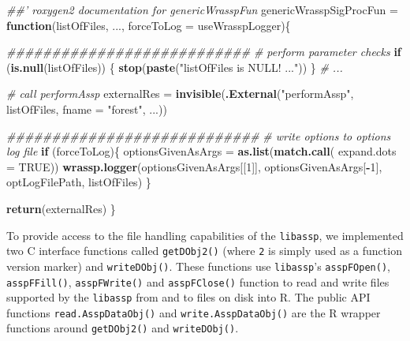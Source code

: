 \documentclass[]{book}
\newenvironment{Shaded}{\begin{snugshade}}{\end{snugshade}}
\newcommand{\CommentTok}[1]{\textcolor[rgb]{0.56,0.35,0.01}{\textit{#1}}}
\newcommand{\ControlFlowTok}[1]{\textcolor[rgb]{0.13,0.29,0.53}{\textbf{#1}}}
\newcommand{\DataTypeTok}[1]{\textcolor[rgb]{0.13,0.29,0.53}{#1}}
\newcommand{\DecValTok}[1]{\textcolor[rgb]{0.00,0.00,0.81}{#1}}
\newcommand{\KeywordTok}[1]{\textcolor[rgb]{0.13,0.29,0.53}{\textbf{#1}}}
\newcommand{\NormalTok}[1]{#1}
\newcommand{\OperatorTok}[1]{\textcolor[rgb]{0.81,0.36,0.00}{\textbf{#1}}}
\newcommand{\OtherTok}[1]{\textcolor[rgb]{0.56,0.35,0.01}{#1}}
\newcommand{\StringTok}[1]{\textcolor[rgb]{0.31,0.60,0.02}{#1}}
\begin{document}
\begin{Shaded}
\begin{Highlighting}[]
\CommentTok{##' roxygen2 documentation for genericWrasspFun}
\NormalTok{genericWrasspSigProcFun =}\StringTok{ }\ControlFlowTok{function}\NormalTok{(listOfFiles,}
\NormalTok{                                   ...,}
                                   \DataTypeTok{forceToLog =}\NormalTok{ useWrasspLogger)\{}
  
  \CommentTok{###########################}
  \CommentTok{# perform parameter checks}
  \ControlFlowTok{if}\NormalTok{ (}\KeywordTok{is.null}\NormalTok{(listOfFiles)) \{}
        \KeywordTok{stop}\NormalTok{(}\KeywordTok{paste}\NormalTok{(}\StringTok{"listOfFiles is NULL! ..."}\NormalTok{))}
\NormalTok{  \}}
  \CommentTok{# ...}
  
  \CommentTok{# call performAssp}
\NormalTok{  externalRes =}\StringTok{ }\KeywordTok{invisible}\NormalTok{(}\KeywordTok{.External}\NormalTok{(}\StringTok{"performAssp"}\NormalTok{, listOfFiles, }
                                    \DataTypeTok{fname =} \StringTok{"forest"}\NormalTok{, ...))}
  
  
  \CommentTok{############################}
  \CommentTok{# write options to options log file}
  \ControlFlowTok{if}\NormalTok{ (forceToLog)\{}
\NormalTok{      optionsGivenAsArgs =}\StringTok{ }\KeywordTok{as.list}\NormalTok{(}\KeywordTok{match.call}\NormalTok{(}
        \DataTypeTok{expand.dots =} \OtherTok{TRUE}\NormalTok{))}
      \KeywordTok{wrassp.logger}\NormalTok{(optionsGivenAsArgs[[}\DecValTok{1}\NormalTok{]], }
\NormalTok{                    optionsGivenAsArgs[}\OperatorTok{-}\DecValTok{1}\NormalTok{],}
\NormalTok{                    optLogFilePath, listOfFiles)}
\NormalTok{  \}    }
  
  \KeywordTok{return}\NormalTok{(externalRes)}
\NormalTok{\}}
\end{Highlighting}
\end{Shaded}

To provide access to the file handling capabilities of the \texttt{libassp}, we implemented two C interface functions called \texttt{getDObj2()} (where \texttt{2} is simply used as a function version marker) and \texttt{writeDObj()}. These functions use \texttt{libassp}'s \texttt{asspFOpen()}, \texttt{asspFFill()}, \texttt{asspFWrite()} and \texttt{asspFClose()} function to read and write files supported by the \texttt{libassp} from and to files on disk into R. The public API functions \texttt{read.AsspDataObj()} and \texttt{write.AsspDataObj()} are the R wrapper functions around \texttt{getDObj2()} and \texttt{writeDObj()}.
\end{document}
